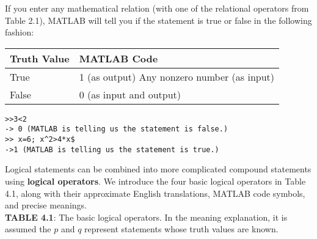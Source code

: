 \documentclass[../main.tex]{subfiles}
\begin{document}
If you enter any mathematical relation (with one of the relational operators from Table 2.1), MATLAB will tell you if the statement is true or false in the following fashion:\\

\begin{tabular}{|l|l|}
\hline
Truth Value & MATLAB Code \\
\hline
True & 1 (as output) Any nonzero number (as input) \\
\hline
False & 0 (as input and output) \\
\hline
\end{tabular}


\begin{verbatim}
>>3<2
-> 0 (MATLAB is telling us the statement is false.)
>> x=6; x^2>4*x$
->1 (MATLAB is telling us the statement is true.)
\end{verbatim}

Logical statements can be combined into more complicated compound statements using \textbf{logical operators}. We introduce the four basic logical operators in Table 4.1, along with their approximate English translations, MATLAB code symbols, and precise meanings.\\

\textbf{TABLE 4.1}: The basic logical operators. In the meaning explanation, it is assumed the $p$ and $q$ represent statements whose truth values are known.

\begin{table}[H]
\end{table}
\end{document}
